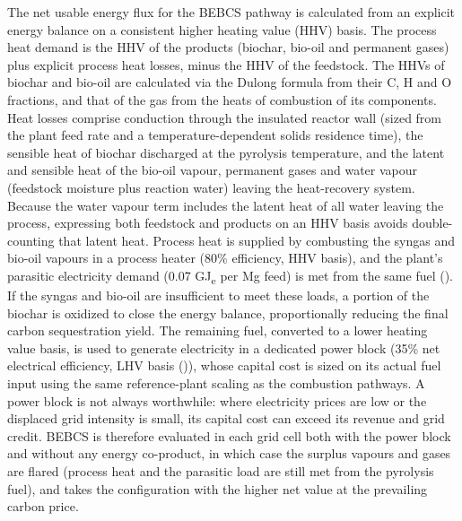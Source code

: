 \documentclass[
  letterpaper,
]{article}
\begin{document}
The net usable energy flux for the BEBCS pathway is calculated from an
explicit energy balance on a consistent higher heating value (HHV)
basis. The process heat demand is the HHV of the products (biochar,
bio-oil and permanent gases) plus explicit process heat losses, minus
the HHV of the feedstock. The HHVs of biochar and bio-oil are calculated
via the Dulong formula from their C, H and O fractions, and that of the
gas from the heats of combustion of its components. Heat losses comprise
conduction through the insulated reactor wall (sized from the plant feed
rate and a temperature-dependent solids residence time), the sensible
heat of biochar discharged at the pyrolysis temperature, and the latent
and sensible heat of the bio-oil vapour, permanent gases and water
vapour (feedstock moisture plus reaction water) leaving the
heat-recovery system. Because the water vapour term includes the latent
heat of all water leaving the process, expressing both feedstock and
products on an HHV basis avoids double-counting that latent heat.
Process heat is supplied by combusting the syngas and bio-oil vapours in
a process heater (80\% efficiency, HHV basis), and the plant's parasitic
electricity demand (0.07 GJ\textsubscript{e} per Mg feed) is met from
the same fuel (). If the syngas and
bio-oil are insufficient to meet these loads, a portion of the biochar
is oxidized to close the energy balance, proportionally reducing the
final carbon sequestration yield. The remaining fuel, converted to a
lower heating value basis, is used to generate electricity in a
dedicated power block (35\% net electrical efficiency, LHV basis
()), whose capital cost is sized on
its actual fuel input using the same reference-plant scaling as the
combustion pathways. A power block is not always worthwhile: where
electricity prices are low or the displaced grid intensity is small, its
capital cost can exceed its revenue and grid credit. BEBCS is therefore
evaluated in each grid cell both with the power block and without any
energy co-product, in which case the surplus vapours and gases are
flared (process heat and the parasitic load are still met from the
pyrolysis fuel), and takes the configuration with the higher net value
at the prevailing carbon price.
\end{document}
